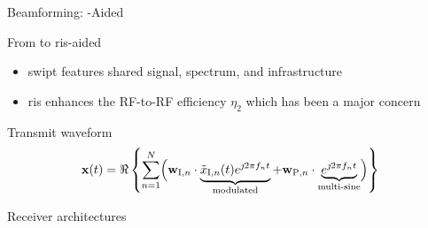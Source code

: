 \documentclass[presentation,xcolor={table},9pt]{beamer}
\begin{document}
\begin{section}{Beamforming: -Aided }
\begin{frame}{From  to \gls{ris}-aided }
		\begin{itemize}
			\item \gls{swipt} features shared signal, spectrum, and infrastructure
			\item \gls{ris} enhances the RF-to-RF efficiency $\eta_2$ which has been a major concern
		\end{itemize}
		\begin{block}{Transmit waveform}
			\begin{equation*}
				\mathbf{x}(t) = \Re \left\{\sum_{n=1}^N \Bigl(\mathbf{w}_{\mathrm{I},n} \cdot \underbrace{\tilde{x}_{\mathrm{I},n}(t) e^{\jmath 2{\pi}{f_n}{t}}}_\text{modulated}+\mathbf{w}_{\mathrm{P},n} \cdot \underbrace{e^{\jmath 2{\pi}{f_n}{t}}}_\text{multi-sine}\Bigr) \right\}
			\end{equation*}
		\end{block}
		\begin{block}{Receiver architectures}
			\vspace{-0.5cm}
			\begin{figure}
				\centering
			\end{figure}
		\end{block}
	\end{frame}


\end{section}
\end{document}
